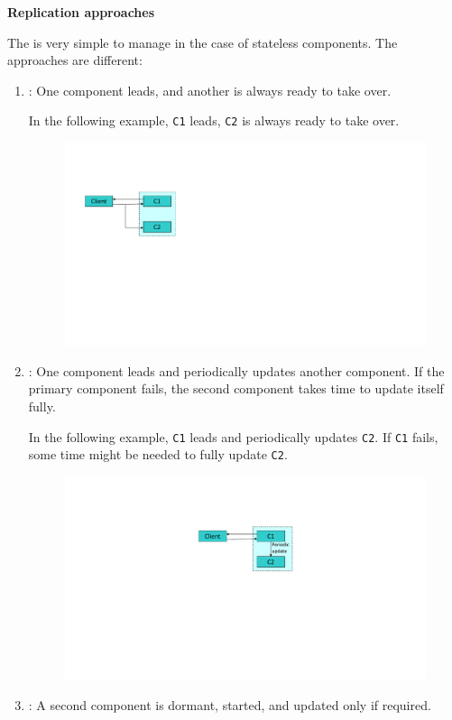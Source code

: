 \begin{flushleft}
    \textcolor{Red2}{ \textbf{Replication approaches}}
\end{flushleft}
The  is very simple to manage in the case of stateless components. The approaches are different:
\begin{enumerate}
    \item {}: One component leads, and another is always ready to take over.
    
    In the following example, \texttt{C1} leads, \texttt{C2} is always ready to take over.
    \begin{figure}[!htp]
        \centering
        \includegraphics[width=.5\textwidth]{img/replication-1.pdf}
    \end{figure}


    \item {}: One component leads and periodically updates another component. If the primary component fails, the second component takes time to update itself fully.
    
    In the following example, \texttt{C1} leads and periodically updates \texttt{C2}. If \texttt{C1} fails, some time might be needed to fully update \texttt{C2}.
    \begin{figure}[!htp]
        \centering
        \includegraphics[width=.5\textwidth]{img/replication-2.pdf}
    \end{figure}

    \newpage

    \item {}: A second component is dormant, started, and updated only if required.


\end{enumerate}
